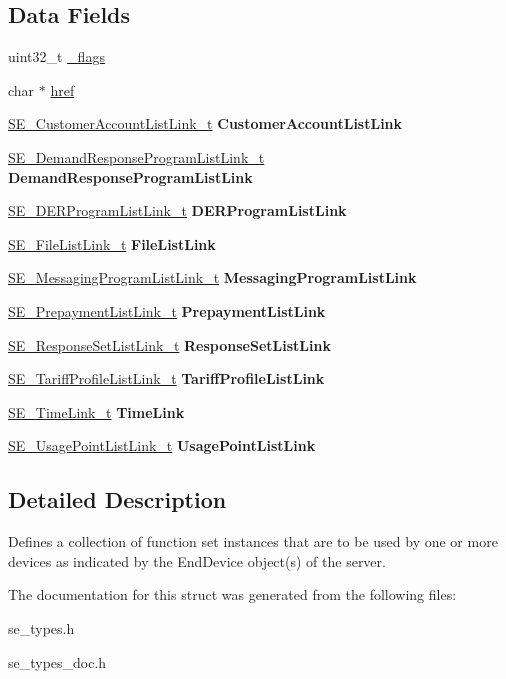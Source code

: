 \subsection*{Data Fields}
\begin{DoxyCompactItemize}
\item 
uint32\+\_\+t \hyperlink{group__FunctionSetAssignmentsBase_ga5d0d51e00ef4d0d4b10f4bdf5b342ef5}{\+\_\+flags}
\item 
char $\ast$ \hyperlink{group__FunctionSetAssignmentsBase_ga1e4079acb45b90e4b02778ab5c0e7147}{href}
\item 
\hyperlink{structSE__CustomerAccountListLink__t}{S\+E\+\_\+\+Customer\+Account\+List\+Link\+\_\+t} {\bfseries Customer\+Account\+List\+Link}
\item 
\hyperlink{structSE__DemandResponseProgramListLink__t}{S\+E\+\_\+\+Demand\+Response\+Program\+List\+Link\+\_\+t} {\bfseries Demand\+Response\+Program\+List\+Link}
\item 
\hyperlink{structSE__DERProgramListLink__t}{S\+E\+\_\+\+D\+E\+R\+Program\+List\+Link\+\_\+t} {\bfseries D\+E\+R\+Program\+List\+Link}
\item 
\hyperlink{structSE__FileListLink__t}{S\+E\+\_\+\+File\+List\+Link\+\_\+t} {\bfseries File\+List\+Link}
\item 
\hyperlink{structSE__MessagingProgramListLink__t}{S\+E\+\_\+\+Messaging\+Program\+List\+Link\+\_\+t} {\bfseries Messaging\+Program\+List\+Link}
\item 
\hyperlink{structSE__PrepaymentListLink__t}{S\+E\+\_\+\+Prepayment\+List\+Link\+\_\+t} {\bfseries Prepayment\+List\+Link}
\item 
\hyperlink{structSE__ResponseSetListLink__t}{S\+E\+\_\+\+Response\+Set\+List\+Link\+\_\+t} {\bfseries Response\+Set\+List\+Link}
\item 
\hyperlink{structSE__TariffProfileListLink__t}{S\+E\+\_\+\+Tariff\+Profile\+List\+Link\+\_\+t} {\bfseries Tariff\+Profile\+List\+Link}
\item 
\hyperlink{structSE__TimeLink__t}{S\+E\+\_\+\+Time\+Link\+\_\+t} {\bfseries Time\+Link}
\item 
\hyperlink{structSE__UsagePointListLink__t}{S\+E\+\_\+\+Usage\+Point\+List\+Link\+\_\+t} {\bfseries Usage\+Point\+List\+Link}
\end{DoxyCompactItemize}


\subsection{Detailed Description}
Defines a collection of function set instances that are to be used by one or more devices as indicated by the End\+Device object(s) of the server. 

The documentation for this struct was generated from the following files\+:\begin{DoxyCompactItemize}
\item 
se\+\_\+types.\+h\item 
se\+\_\+types\+\_\+doc.\+h\end{DoxyCompactItemize}
